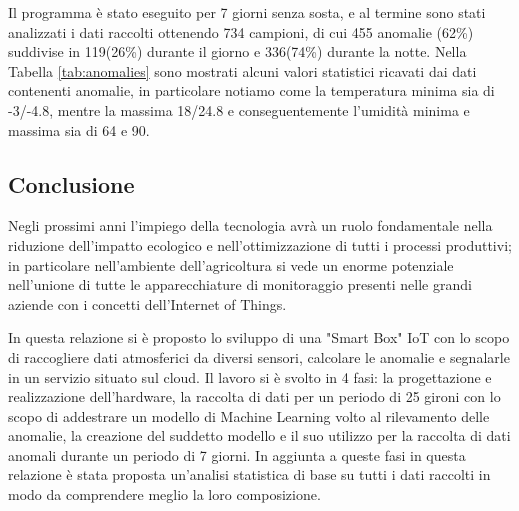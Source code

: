 \documentclass[a4paper, 12pt]{report}
\begin{document}
Il programma è stato eseguito per 7 giorni senza sosta, e al termine sono stati analizzati i dati raccolti ottenendo 734 campioni, di cui 455 anomalie (62\%) suddivise in 119(26\%) durante il giorno e 336(74\%) 
durante la notte. Nella Tabella \ref{tab:anomalies} sono mostrati alcuni valori statistici ricavati dai dati contenenti anomalie, in particolare notiamo come la temperatura minima sia di -3/-4.8, mentre la 
massima 18/24.8 e conseguentemente l'umidità minima e massima sia di 64 e 90.

\subsection*{Conclusione}
\vspace{0.5cm}

Negli prossimi anni l'impiego della tecnologia avrà un ruolo fondamentale nella riduzione dell'impatto ecologico e nell'ottimizzazione di tutti i processi produttivi; in particolare nell'ambiente dell'agricoltura
si vede un enorme potenziale nell'unione di tutte le apparecchiature di monitoraggio presenti nelle grandi aziende con i concetti dell'Internet of Things. 

In questa relazione si è proposto lo sviluppo di una "Smart Box" IoT con lo scopo di raccogliere dati atmosferici da diversi sensori, calcolare le anomalie e segnalarle in un servizio situato sul cloud. 
Il lavoro si è svolto in 4 fasi: la progettazione e realizzazione dell'hardware, la raccolta di dati per un periodo di 25 gironi con lo scopo di addestrare un modello di Machine Learning volto al rilevamento delle 
anomalie, la creazione del suddetto modello e il suo utilizzo per la raccolta di dati anomali durante un periodo di 7 giorni. 
In aggiunta a queste fasi in questa relazione è stata proposta un'analisi statistica di base su tutti i dati raccolti in modo da comprendere meglio la loro composizione.



\printbibliography
\end{document}
